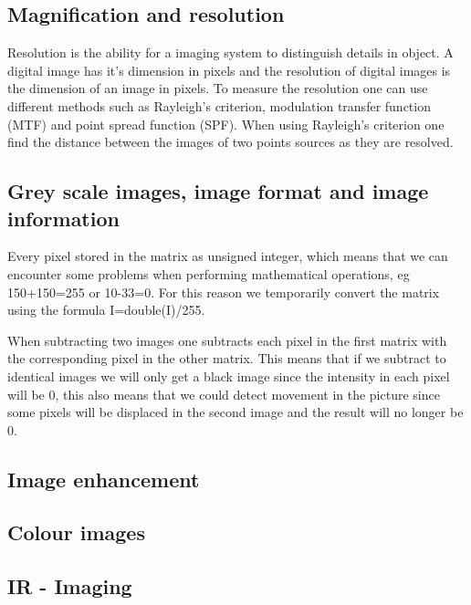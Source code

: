 \subsection{Magnification and resolution}
Resolution is the ability for a imaging system to distinguish details in object. A digital image has it's dimension in pixels and the resolution of digital images is the dimension of an image in pixels. To measure the resolution one can use different methods such as Rayleigh's criterion, modulation transfer function (MTF) and point spread function (SPF). 
When using Rayleigh's criterion one find the distance between the images of two points sources as they are resolved.
% 

\subsection{Grey scale images, image format and image information}
Every pixel stored in the matrix as unsigned integer, which means that we can encounter some problems when performing mathematical operations, eg 150+150=255 or 10-33=0. For this reason we temporarily convert the matrix using the formula I=double(I)/255. 

When subtracting two images one subtracts each pixel in the first matrix with the corresponding pixel in the other matrix. %
This means that if we subtract to identical images we will only get a black image since the intensity in each pixel will be 0, this also means that we could detect movement in the picture since some pixels will be displaced in the second image and the result will no longer be 0.
\subsection{Image enhancement}

\subsection{Colour images}


\subsection{IR - Imaging}